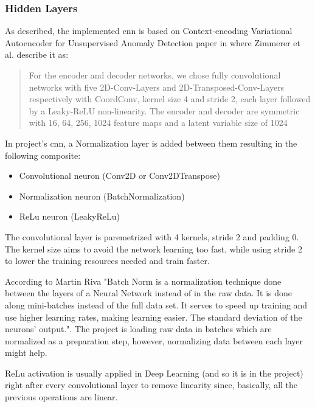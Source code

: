 \FloatBarrier

\subsubsection{Hidden Layers}

As described, the implemented \acrshort{cnn} is based on Context-encoding Variational Autoencoder for Unsupervised Anomaly Detection paper \cite{cevaemodel} in where Zimmerer et al. describe it as: 

\begin{quote}
    For the encoder and decoder networks, we chose fully convolutional networks with five 2D-Conv-Layers and 2D-Transposed-Conv-Layers respectively with CoordConv, kernel size 4 and stride 2, each layer followed by a Leaky-ReLU non-linearity. The encoder and decoder are symmetric with 16, 64, 256, 1024 feature maps and a latent variable size of 1024
\end{quote}

In project's \acrfull{cnn}, a Normalization layer is added between them resulting in the following composite:

\begin{itemize}
    \item Convolutional neuron (Conv2D or Conv2DTranspose) 
    \item Normalization neuron (BatchNormalization)
    \item ReLu neuron (LeakyReLu)
\end{itemize}

The convolutional layer is paremetrized with 4 kernels, stride 2 and padding 0. The kernel size aims to avoid the network learning too fast, while using stride 2 to lower the training resources needed and train faster.

According to Martin Riva \cite{batchnorm} "Batch Norm is a normalization technique done between the layers of a Neural Network instead of in the raw data. It is done along mini-batches instead of the full data set. It serves to speed up training and use higher learning rates, making learning easier. The standard deviation of the neurons' output.". The project is loading raw data in batches which are normalized as a preparation step, however, normalizing data between each layer might help.

ReLu activation is usually applied in Deep Learning (and so it is in the project) right after every convolutional layer to remove linearity since, basically, all the previous operations are linear. 

